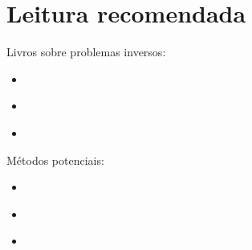 \chapter{Leitura recomendada}

\noindent 
Livros sobre problemas inversos:

\begin{itemize}
\item \cite{tarantola}
\item \cite{menke}
\item \cite{aster}
\end{itemize}

\noindent
Métodos potenciais:

\begin{itemize}
\item \cite{silva_etal2001}
\item \cite{medeiros&silva1996}
\item \cite{martins_etal2011}
\end{itemize}
